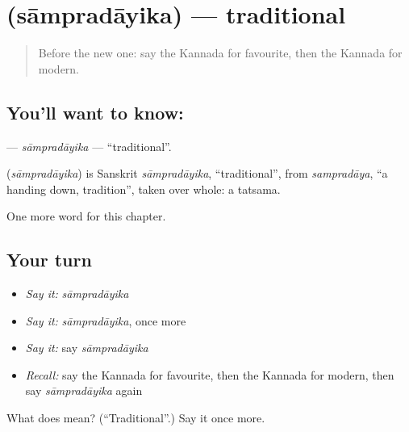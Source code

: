 \section[\texorpdfstring{\kn{ಸಾಂಪ್ರದಾಯಿಕ} (sāmpradāyika)}{ಸಾಂಪ್ರದಾಯಿಕ (sāmpradāyika)}]{ (sāmpradāyika) — traditional}

\label{lesson:KA-C181-sampradayika}



\begin{quote}
Before the new one: say the Kannada for favourite, then the Kannada for modern.
\end{quote}

\subsection*{You'll want to know: }
\textbf{} — \emph{sāmpradāyika} — \textquotedblleft{}traditional\textquotedblright{}.

\begin{cousinweb}
\textbf{} (\emph{sāmpradāyika}) is Sanskrit \emph{sāmpradāyika}, \textquotedblleft{}traditional\textquotedblright{}, from \emph{sampradāya}, \textquotedblleft{}a handing down, tradition\textquotedblright{}, taken over whole: a tatsama.
\end{cousinweb}

\begin{grammarlens}[title={What you've built}]
One more word for this chapter.
\end{grammarlens}

\subsection*{Your turn}
\begin{itemize}
\raggedright
  \item \emph{Say it:} \emph{sāmpradāyika}
  \item \emph{Say it:} \emph{sāmpradāyika}, once more
  \item \emph{Say it:} say \emph{sāmpradāyika}
  \item \emph{Recall:} say the Kannada for favourite, then the Kannada for modern, then say \emph{sāmpradāyika} again
\end{itemize}

\begin{tcolorbox}[breakable,colback=teal!4,colframe=teal!35!black,title={Before you move on}]
What does  mean? (\textquotedblleft{}Traditional\textquotedblright{}.) Say it once more.
\end{tcolorbox}
